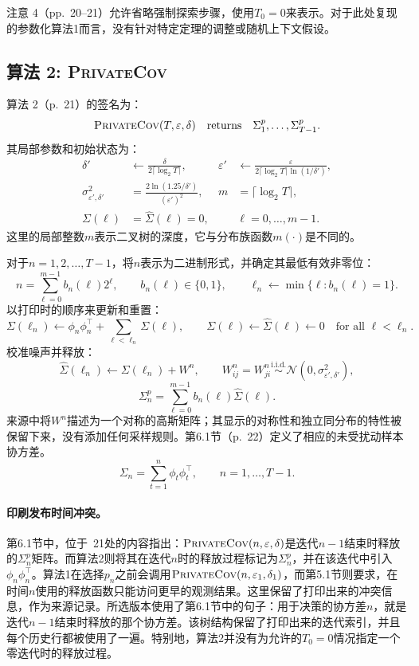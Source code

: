 \documentclass{article}
\begin{document}
注意 4（pp.~20–21）允许省略强制探索步骤，使用$T_0=0$来表示。对于此处复现的参数化算法1而言，没有针对特定定理的调整或随机上下文假设。

\subsection*{算法 2: \textsc{PrivateCov}}
算法 2（p.~21）的签名为：
\[
\textsc{PrivateCov}(T,\varepsilon,\delta)
\quad\text{returns}\quad\Sigma_1^p,\ldots,\Sigma_{T-1}^p.
\]
其局部参数和初始状态为：
\begin{align*}
\delta'&\leftarrow\frac{\delta}{2\lceil\log_2T\rceil},
&\varepsilon'&\leftarrow
\frac{\varepsilon}{2\lceil\log_2T\rceil\ln(1/\delta')},\\
\sigma_{\varepsilon',\delta'}^2
&=\frac{2\ln(1.25/\delta')}{(\varepsilon')^2},
&m&=\lceil\log_2T\rceil,\\
\Sigma(\ell)&=\widehat\Sigma(\ell)=0,
&&\ell=0,\ldots,m-1.
\end{align*}
这里的局部整数$m$表示二叉树的深度，它与分布族函数$m(\cdot)$是不同的。

对于$n=1,2,\ldots,T-1$，将$n$表示为二进制形式，并确定其最低有效非零位：
\[
n=\sum_{\ell=0}^{m-1}b_n(\ell)2^\ell,
\qquad b_n(\ell)\in\{0,1\},
\qquad \ell_n\leftarrow\min\{\ell:b_n(\ell)=1\}.
\]
以打印时的顺序来更新和重置：
\[
\Sigma(\ell_n)\leftarrow
\phi_n\phi_n^{\top}+\sum_{\ell<\ell_n}\Sigma(\ell),
\qquad
\Sigma(\ell)\leftarrow\widehat\Sigma(\ell)\leftarrow0
\quad\text{for all }\ell<\ell_n.
\]
校准噪声并释放：
\[
\widehat\Sigma(\ell_n)\leftarrow\Sigma(\ell_n)+W^n,
\qquad
W^n_{ij}=W^n_{ji}\overset{\mathrm{i.i.d.}}{\sim}
\mathcal N(0,\sigma_{\varepsilon',\delta'}^2),
\]
\[
\Sigma_n^p=\sum_{\ell=0}^{m-1}b_n(\ell)\widehat\Sigma(\ell).
\]
来源中将$W^n$描述为一个对称的高斯矩阵；其显示的对称性和独立同分布的特性被保留下来，没有添加任何采样规则。第6.1节（p.~22）定义了相应的未受扰动样本协方差。
\[
\Sigma_n=\sum_{t=1}^{n}\phi_t\phi_t^{\top},
\qquad n=1,\ldots,T-1.
\]

\paragraph{印刷发布时间冲突。}
第6.1节中，位于~21处的内容指出：$\textsc{PrivateCov}(n,\varepsilon,\delta)$是迭代$n-1$结束时释放的$\Sigma_n^p$矩阵。而算法2则将其在迭代$n$时的释放过程标记为$\Sigma_n^p$，并在该迭代中引入$\phi_n\phi_n^{\top}$。算法1在选择$p_n$之前会调用$\textsc{PrivateCov}(n,\varepsilon_1,\delta_1)$，而第5.1节则要求，在时间$n$使用的释放函数只能访问更早的观测结果。这里保留了打印出来的冲突信息，作为来源记录。所选版本使用了第6.1节中的句子：用于决策的协方差$n$，就是迭代$n-1$结束时释放的那个协方差。该树结构保留了打印出来的迭代索引，并且每个历史行都被使用了一遍。特别地，算法2并没有为允许的$T_0=0$情况指定一个零迭代时的释放过程。
\end{document}
